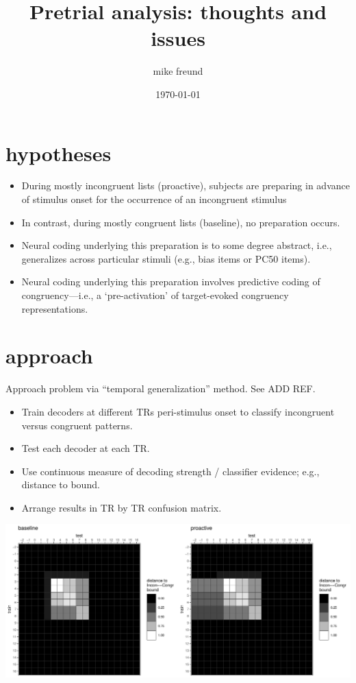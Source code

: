 \documentclass{article}\usepackage[]{graphicx}\usepackage[]{color}
\makeatletter
\def\maxwidth{ %
  \ifdim\Gin@nat@width>\linewidth
    \linewidth
  \else
    \Gin@nat@width
  \fi
}
\newenvironment{knitrout}{}{} %
\makeatother
\begin{document}
\title{Pretrial analysis: thoughts and issues}
\author{mike freund}
\date{\today}
\maketitle


\section*{hypotheses}

\begin{itemize}
  \item During mostly incongruent lists (proactive), subjects are preparing in advance of stimulus onset for the occurrence of an incongruent stimulus
  \item In contrast, during mostly congruent lists (baseline), no preparation occurs.
  \item Neural coding underlying this preparation is to some degree abstract, i.e., generalizes across particular stimuli (e.g., bias items or PC50 items).
  \item Neural coding underlying this preparation involves predictive coding of congruency---i.e., a `pre-activation' of target-evoked congruency representations.
\end{itemize}


\section*{approach}

Approach problem via ``temporal generalization'' method.
See ADD REF.

\begin{itemize}
  \item Train decoders at different TRs peri-stimulus onset to classify incongruent versus congruent patterns.
  \item Test each decoder at each TR.
  \item Use continuous measure of decoding strength / classifier evidence; e.g., distance to bound.
  \item Arrange results in TR by TR confusion matrix.
\end{itemize}



\begin{knitrout}
\color{fgcolor}
\includegraphics[width=\maxwidth]{figure/unnamed-chunk-1-1} 

\end{knitrout}
\end{document}
